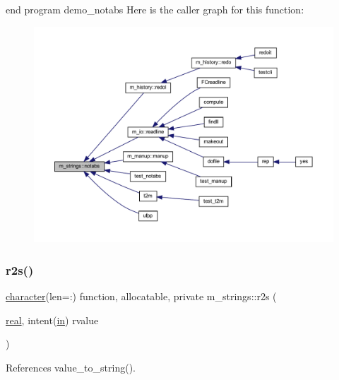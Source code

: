 end program demo\+\_\+notabs Here is the caller graph for this function\+:
\nopagebreak
\begin{figure}[H]
\begin{center}
\leavevmode
\includegraphics[width=350pt]{namespacem__strings_a3bf44ac06a670f55830e17a6f1108b9c_icgraph}
\end{center}
\end{figure}
\mbox{\label{namespacem__strings_a5adef1b5667afe21e0ee21cfdba13b45}} 
\subsubsection{\texorpdfstring{r2s()}{r2s()}}
{\footnotesize\ttfamily \hyperlink{option__stopwatch_83_8txt_abd4b21fbbd175834027b5224bfe97e66}{character}(len=\+:) function, allocatable, private m\+\_\+strings\+::r2s (\begin{DoxyParamCaption}\item[{\hyperlink{read__watch_83_8txt_abdb62bde002f38ef75f810d3a905a823}{real}, intent(\hyperlink{M__journal_83_8txt_afce72651d1eed785a2132bee863b2f38}{in})}]{rvalue }\end{DoxyParamCaption})\hspace{0.3cm}{\ttfamily [private]}}



References value\+\_\+to\+\_\+string().

